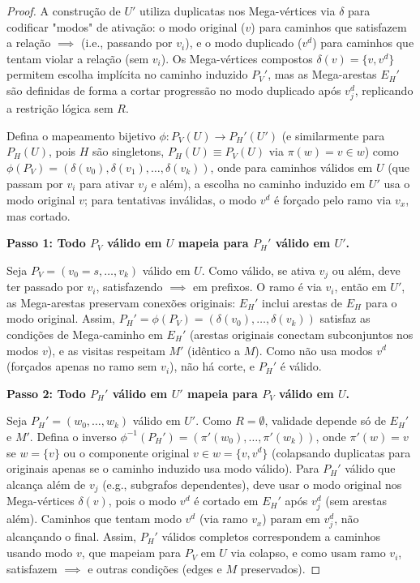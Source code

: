 \documentclass{article}
\begin{document}
\begin{proof}
A construção de \( U' \) utiliza duplicatas nos Mega-vértices via \( \delta \) para codificar "modos" de ativação: o modo original (\( v \)) para caminhos que satisfazem a relação \( \implies \) (i.e., passando por \( v_i \)), e o modo duplicado (\( v^d \)) para caminhos que tentam violar a relação (sem \( v_i \)). Os Mega-vértices compostos \( \delta(v) = \{v, v^d\} \) permitem escolha implícita no caminho induzido \( P_V' \), mas as Mega-arestas \( E_H' \) são definidas de forma a cortar progressão no modo duplicado após \( v_j^d \), replicando a restrição lógica sem \( R \).

Defina o mapeamento bijetivo \( \phi: P_V(U) \to P_H'(U') \) (e similarmente para \( P_H(U) \), pois \( H \) são singletons, \( P_H(U) \equiv P_V(U) \) via \( \pi(w) = v \in w \)) como \( \phi(P_V) = (\delta(v_0), \delta(v_1), \dots, \delta(v_k)) \), onde para caminhos válidos em \( U \) (que passam por \( v_i \) para ativar \( v_j \) e além), a escolha no caminho induzido em \( U' \) usa o modo original \( v \); para tentativas inválidas, o modo \( v^d \) é forçado pelo ramo via \( v_x \), mas cortado.

\textbf{Passo 1: Todo \( P_V \) válido em \( U \) mapeia para \( P_H' \) válido em \( U' \).}

Seja \( P_V = (v_0 = s, \dots, v_k) \) válido em \( U \). Como válido, se ativa \( v_j \) ou além, deve ter passado por \( v_i \), satisfazendo \( \implies \) em prefixos. O ramo é via \( v_i \), então em \( U' \), as Mega-arestas preservam conexões originais: \( E_H' \) inclui arestas de \( E_H \) para o modo original. Assim, \( P_H' = \phi(P_V) = (\delta(v_0), \dots, \delta(v_k)) \) satisfaz as condições de Mega-caminho em \( E_H' \) (arestas originais conectam subconjuntos nos modos \( v \)), e as visitas respeitam \( M' \) (idêntico a \( M \)). Como não usa modos \( v^d \) (forçados apenas no ramo sem \( v_i \)), não há corte, e \( P_H' \) é válido.

\textbf{Passo 2: Todo \( P_H' \) válido em \( U' \) mapeia para \( P_V \) válido em \( U \).}

Seja \( P_H' = (w_0, \dots, w_k) \) válido em \( U' \). Como \( R = \emptyset \), validade depende só de \( E_H' \) e \( M' \). Defina o inverso \( \phi^{-1}(P_H') = (\pi'(w_0), \dots, \pi'(w_k)) \), onde \( \pi'(w) = v \) se \( w = \{v\} \) ou o componente original \( v \in w = \{v, v^d\} \) (colapsando duplicatas para originais apenas se o caminho induzido usa modo válido). Para \( P_H' \) válido que alcança além de \( v_j \) (e.g., subgrafos dependentes), deve usar o modo original nos Mega-vértices \( \delta(v) \), pois o modo \( v^d \) é cortado em \( E_H' \) após \( v_j^d \) (sem arestas além). Caminhos que tentam modo \( v^d \) (via ramo \( v_x \)) param em \( v_j^d \), não alcançando o final. Assim, \( P_H' \) válidos completos correspondem a caminhos usando modo \( v \), que mapeiam para \( P_V \) em \( U \) via colapso, e como usam ramo \( v_i \), satisfazem \( \implies \) e outras condições (edges e \( M \) preservados).
\newpage


\end{proof}
\end{document}
